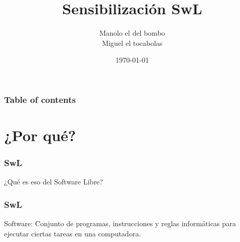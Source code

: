 \documentclass{beamer}
\begin{document}
\title{Sensibilización SwL}
\author{Manolo el del bombo\\Miguel el tocabolas}
\date{\today}

\begin{frame}
\titlepage
\end{frame}

\begin{frame}
\frametitle{Table of contents}\tableofcontents
\end{frame}


\section{¿Por qué?}


\begin{frame}\frametitle{SwL}
¿Qué es eso del Software Libre?
\end{frame}





\begin{frame}\frametitle{SwL}



Software: \pause Conjunto de programas,
instrucciones y reglas informáticas para
ejecutar ciertas tareas en una computadora.
\end{frame}
\end{document}
